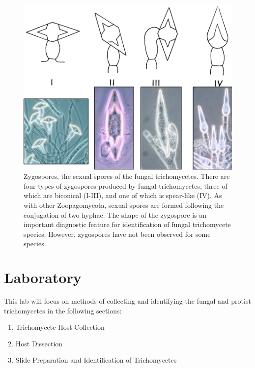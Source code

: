 \documentclass[]{book}
\providecommand{\tightlist}{%
  \setlength{\itemsep}{0pt}\setlength{\parskip}{0pt}}
\begin{document}
\begin{figure}

{\centering \includegraphics[width=12.03in]{img/Ch4_Fig5} 

}

\caption{Zygospores, the sexual spores of the fungal trichomycetes.  There are four types of zygospores produced by fungal trichomycetes, three of which are biconical (I-III), and one of which is spear-like (IV).  As with other Zoopagomycota, sexual spores are formed following the conjugation of two hyphae.  The shape of the zygospore is an important diagnostic feature for identification of fungal trichomycete species. However, zygospores have not been observed for some species.}\label{fig:ch4fig5}
\end{figure}

\hypertarget{laboratory}{%
\section{Laboratory}\label{laboratory}}

This lab will focus on methods of collecting and identifying the fungal and protist trichomycetes in the following sections:

\begin{enumerate}
\def\labelenumi{\arabic{enumi}.}
\tightlist
\item
  Trichomycete Host Collection
\item
  Host Dissection
\item
  Slide Preparation and Identification of Trichomycetes
\end{enumerate}
\end{document}
